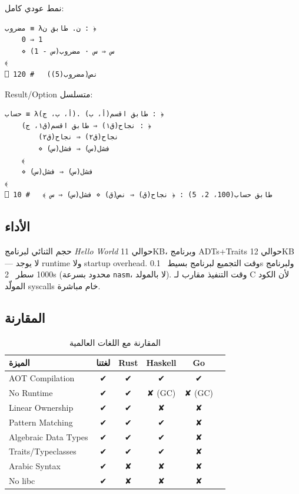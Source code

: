 \documentclass[sigconf]{acmart}
\begin{document}
نمط عودي كامل:

\begin{lstlisting}[style=arlang]
مضروب ≡ λن. طابق ن : ﴿
    0 ⇒ 1
    ⋄ س ⇒ س · مضروب(س - 1)
﴾
⎕ نص(مضروب(5))   # 120
\end{lstlisting}

Result/Option متسلسل:

\begin{lstlisting}[style=arlang]
حساب ≡ λ(أ، ب، ج). طابق اقسم(أ، ب) : ﴿
    نجاح(ق١) ⇒ طابق اقسم(ق١، ج) : ﴿
        نجاح(ق٢) ⇒ نجاح(ق٢)
        ⋄ فشل(س) ⇒ فشل(س)
    ﴾
    ⋄ فشل(س) ⇒ فشل(س)
﴾
⎕ طابق حساب(100، 2، 5) : ﴿ نجاح(ق) ⇒ نص(ق) ⋄ فشل(س) ⇒ س ﴾   # 10
\end{lstlisting}

\subsection{الأداء}
\label{sec:evaluation:performance}

حجم الثنائي لبرنامج \emph{Hello World} حوالي 11KB، وبرنامج ADTs+Traits حوالي
12KB — لا يوجد runtime ولا startup overhead. وقت التجميع لبرنامج بسيط ~0.1s
ولبرنامج 1000 سطر ~2s (محدود بسرعة \texttt{nasm}، لا بالمولد). وقت التنفيذ
مقارب لـ C لأن الكود المولّد syscalls خام مباشرة.

\subsection{المقارنة}
\label{sec:evaluation:comparison}

\begin{table}[h]
\centering
\caption{المقارنة مع اللغات العالمية}
\label{tab:comparison}
\begin{tabular}{lccccc}
\toprule
\textbf{الميزة} & \textbf{لغتنا} & \textbf{Rust} & \textbf{Haskell} & \textbf{Go} \\
\midrule
AOT Compilation & ✔ & ✔ & ✔ & ✔ \\
No Runtime & ✔ & ✔ & ✘ (GC) & ✘ (GC) \\
Linear Ownership & ✔ & ✔ & ✘ & ✘ \\
Pattern Matching & ✔ & ✔ & ✔ & ✘ \\
Algebraic Data Types & ✔ & ✔ & ✔ & ✘ \\
Traits/Typeclasses & ✔ & ✔ & ✔ & ✘ \\
Arabic Syntax & ✔ & ✘ & ✘ & ✘ \\
No libc & ✔ & ✘ & ✘ & ✘ \\
\bottomrule
\end{tabular}
\end{table}
\end{document}
